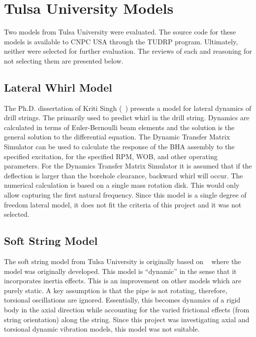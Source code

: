 \section{Tulsa University Models}
Two models from Tulsa University were evaluated.  The source code for these models is available to CNPC USA through the TUDRP program. Ultimately, neither were selected for further evaluation.  The reviews of each and reasoning for not selecting them are presented below.

\subsection{Lateral Whirl Model}
The Ph.D. dissertation of Kriti Singh (~\cite{ref:singh2019a}) presents a model for lateral dynamics of drill strings.  The primarily used to predict whirl in the drill string.  Dynamics are calculated in terms of Euler-Bernoulli beam elements and the solution is the general solution to the differential equation.  The Dynamic Transfer Matrix Simulator can be used to calculate the response of the BHA assembly to the specified excitation, for the specified RPM, WOB, and other operating parameters.  For the Dynamics Transfer Matrix Simulator it is assumed that if the deflection is larger than the borehole clearance, backward whirl will occur.  The numerical calculation is based on a single mass rotation disk.  This would only allow capturing the first natural frequency.  Since this model is a single degree of freedom lateral model, it does not fit the criteria of this project and it was not selected.

\subsection{Soft String Model}
The soft string model from Tulsa University is originally based on ~\cite{ref:miska2015a} where the model was originally developed.  This model is ``dynamic'' in the sense that it incorporates inertia effects.  This is an improvement on other models which are purely static.  A key assumption is that the pipe is not rotating, therefore, torsional oscillations are ignored.  Essentially, this becomes dynamics of a rigid body in the axial direction while accounting for the varied frictional effects (from string orientation) along the string.  Since this project was investigating axial and torsional dynamic vibration models, this model was not suitable.

